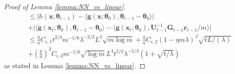 \begin{proof}[Proof of Lemma \ref{lemma:NN_vs_linear}]
\begin{equation*}
\begin{split}
        & \leq  \left \lvert h(\mathbf{x}; \boldsymbol{\theta}_{t-1}) - \langle \mathbf{g}(\mathbf{x}; \boldsymbol{\theta}_0), \boldsymbol{\theta}_{t-1} - \boldsymbol{\theta}_0 \rangle  \right\rvert \\ 
        &  + \lvert \langle\mathbf{g}(\mathbf{x}_{t};\boldsymbol{\theta}_{0}),\boldsymbol{\theta}_{t-1}-\boldsymbol{\theta}_{0}\rangle-\langle\mathbf{g}(\mathbf{x}_{t};\boldsymbol{\theta}_{0}),\mathbf{U}_{t-1}^{-1}\mathbf{G}_{t-1}\mathbf{r}_{t-1}/m\rangle \rvert \\
        & \leq \frac{b}{a} C_{\epsilon,1}   t^{2/3}m^{-1/6}\lambda^{-2/3} L^{3}\sqrt{m\log m} + \frac{b}{a} C_{\epsilon,2} (1-\eta m\lambda)^{J} \sqrt{tL/(\lambda)} \\  
        & +\left(\frac{b}{a} \right)^3 C_{\epsilon,3} m^{-1/6} \sqrt{\log m} L^4 t^{5/3} \lambda ^{-5/3} \left(1 + \sqrt{t/\lambda} \right)  
    \end{split}
\end{equation*} 
as stated in Lemma \ref{lemma:NN_vs_linear}.
\end{proof}

